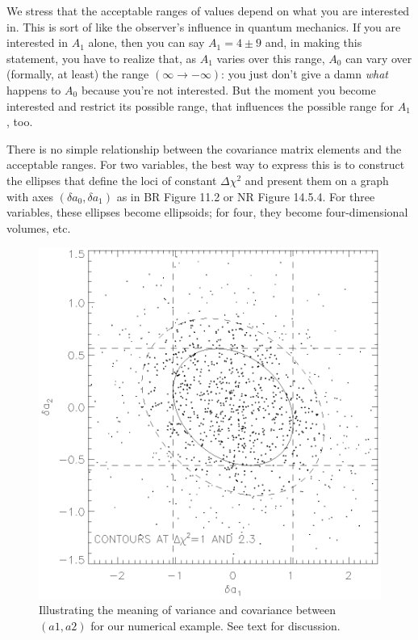 \documentclass[psfig,preprint]{aastex}
\begin{document}
	We stress that the acceptable ranges of values depend on what
you are interested in.  This is sort of like the observer's influence in
quantum mechanics.  If you are interested in $A_1$ alone, then you can
say $A_1 = 4 \pm 9$ and, in making this statement, you have to realize
that, as $A_1$ varies over this range, $A_0$ can vary over (formally, at
least) the range $(\infty \rightarrow -\infty)$: you just don't give a
damn {\it what} happens to $A_0$ because you're not interested.  But the
moment you become interested and restrict its possible range, that
influences the possible range for $A_1$, too. 

	There is no simple relationship between the covariance matrix
elements and the acceptable ranges.  For two variables, the best way to
express this is to construct the ellipses that define the loci of
constant $\Delta \chi^2$ and present them on a graph with axes $(\delta
a_0, \delta a_1)$ as in BR Figure 11.2 or NR Figure 14.5.4.  For three
variables, these ellipses become ellipsoids; for four, they become
four-dimensional volumes, etc. 

\begin{figure}[h!] 
\begin{center} 
\leavevmode
\includegraphics{chisq.ps} 
\end{center} 
\caption{Illustrating
the meaning of variance and covariance between $(a1,a2)$ for our numerical
example. See text for discussion. \label{figchisq}}
\end{figure}
\end{document}
